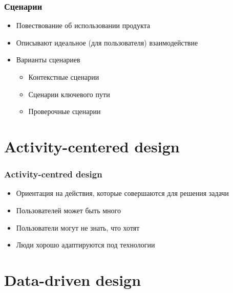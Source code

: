 \documentclass{../../slides-style}
\begin{document}
    \begin{frame}
        \frametitle{Сценарии}
        \begin{itemize}
            \item Повествование об использовании продукта
            \item Описывают идеальное (для пользователя) взаимодействие
            \item Варианты сценариев
            \begin{itemize}
                \item Контекстные сценарии
                \item Сценарии ключевого пути
                \item Проверочные сценарии
            \end{itemize}
        \end{itemize}
    \end{frame}

    \section{Activity-centered design}

    \begin{frame}
        \frametitle{Activity-centred design}
        \begin{itemize}
            \item Ориентация на действия, которые совершаются для решения задачи
            \item Пользователей может быть много
            \item Пользователи могут не знать, что хотят
            \item Люди хорошо адаптируются под технологии
        \end{itemize}
    \end{frame}

    \section{Data-driven design}
\end{document}
